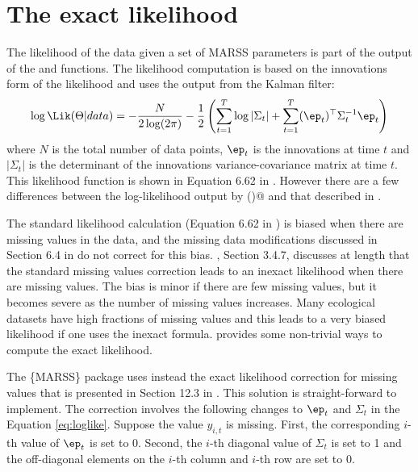 \section{The exact likelihood}
\label{sec:exactlikelihood}
The likelihood of the data given a set of MARSS parameters is part of the output of the \verb@MARSSkfss@{} and \verb@MARSSkfas@{}
 functions.  The likelihood computation is based on the innovations form of the likelihood \citep{Schweppe1965} and uses the output from the Kalman filter:
\begin{equation}
\log \Lik(\Theta | data) = -\frac{N}{2\log(2\pi)} - \frac{1}{2}\left( \sum_{t=1}^T\log |\Sigma_t| + \sum_{t=1}^T (\ep_t)^\top \Sigma_t^{-1} \ep_t \right)
\label{eq:loglike}
\end{equation}
where $N$ is the total number of data points, $\ep_t$ is the innovations at time $t$ and $|\Sigma_t|$ is the determinant of the innovations variance-covariance matrix at time $t$.  This likelihood function is shown in Equation 6.62 in \citet{ShumwayStoffer2006}. However there are a few differences between the log-likelihood output by \verb@MARSSkf()@ and that described in \citet{ShumwayStoffer2006}.

The standard likelihood calculation (Equation 6.62 in \citet{ShumwayStoffer2006}) is biased when there are missing values in the data, and the missing data modifications discussed in Section 6.4 in \citet{ShumwayStoffer2006} do not correct for this bias. \citet{Harvey1989}, Section 3.4.7, discusses at length that the standard missing values correction leads to an inexact likelihood when there are missing values. The bias is minor if there are few missing values, but it becomes severe as the number of missing values increases.  Many ecological datasets have high fractions of missing values and this  leads to a very biased likelihood if one uses the inexact formula.  \citet{Harvey1989} provides some non-trivial ways to compute the exact likelihood.  

The \{MARSS\} package uses instead the exact likelihood correction for missing values that is presented in Section 12.3 in \citet{BrockwellDavis1991}.  This solution is straight-forward to implement.  The correction involves the following changes to $\ep_t$ and $\Sigma_t$ in the Equation \ref{eq:loglike}.  Suppose the value $y_{i,t}$ is missing.  First, the corresponding $i$-th value of $\ep_t$ is set to 0.  Second, the $i$-th diagonal value of $\Sigma_t$ is set to 1 and the off-diagonal elements on the $i$-th column and $i$-th row are set to 0. 

